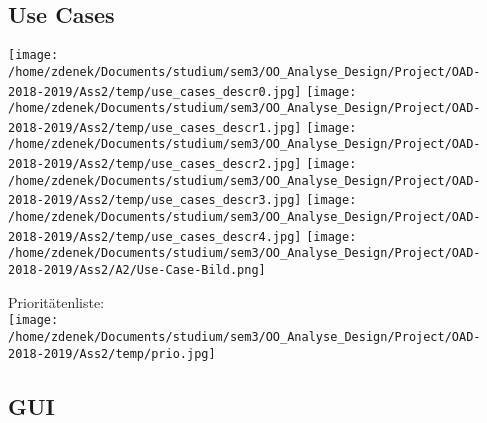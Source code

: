 \documentclass[a4paper]{article}
\begin{document}
\subsection{Use Cases}



\texttt{[image: /home/zdenek/Documents/studium/sem3/OO\_Analyse\_Design/Project/OAD-2018-2019/Ass2/temp/use\_cases\_descr0.jpg]}
\newpage
\texttt{[image: /home/zdenek/Documents/studium/sem3/OO\_Analyse\_Design/Project/OAD-2018-2019/Ass2/temp/use\_cases\_descr1.jpg]}
\newpage
\texttt{[image: /home/zdenek/Documents/studium/sem3/OO\_Analyse\_Design/Project/OAD-2018-2019/Ass2/temp/use\_cases\_descr2.jpg]}
\newpage
\texttt{[image: /home/zdenek/Documents/studium/sem3/OO\_Analyse\_Design/Project/OAD-2018-2019/Ass2/temp/use\_cases\_descr3.jpg]}
\newpage
\texttt{[image: /home/zdenek/Documents/studium/sem3/OO\_Analyse\_Design/Project/OAD-2018-2019/Ass2/temp/use\_cases\_descr4.jpg]}
\newpage
\texttt{[image: /home/zdenek/Documents/studium/sem3/OO\_Analyse\_Design/Project/OAD-2018-2019/Ass2/A2/Use-Case-Bild.png]}

Prioritätenliste: \\

\texttt{[image: /home/zdenek/Documents/studium/sem3/OO\_Analyse\_Design/Project/OAD-2018-2019/Ass2/temp/prio.jpg]}


\newpage

\subsection{GUI}
\end{document}
